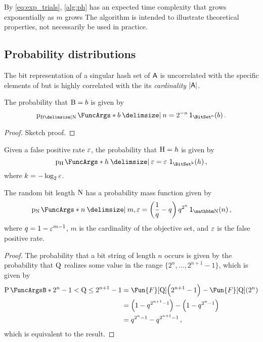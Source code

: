 \documentclass[ ../main.tex]{subfiles}
\begin{document}
By \cref{eq:exp_trials}, \cref{alg:ph} has an expected time complexity that grows exponentially as $m$ grows The algorithm is intended to illustrate theoretical properties, not necessarily be used in practice.

\subsection{Probability distributions}
The bit representation of a singular hash set of $\Set{A}$ is uncorrelated with the specific elements of but is highly correlated with the its \emph{cardinality} $\Card{\Set{A}}$.



The probability that $\mathrm{B} = b$ is given by
\begin{equation}
\PDF{b \Given n}[\RV{B} \Given \RV{N}] = 2^{-n} \SetIndicator{\BitSet^n}(b)\,.
\end{equation}
\begin{proof}
Sketch proof.
\end{proof}




Given a false positive rate $\varepsilon$, the probability that $\mathrm{H} = h$ is given by
\begin{equation}
	\PDF{h \Given \fprate}[\RV{H}] = \fprate \, \SetIndicator{\BitSet^k}(h)\,,
\end{equation}
where $k = -\log_2 \varepsilon$.



\begin{theorem}
	The random bit length $\mathrm{N}$ has a probability mass function given by
	\begin{equation}
	\label{eq:N_pmf}
	\PDF{n \Given m, \fprate}[\RV{N}] = \left(\frac{1}{q}-q\right) q^{2^n} \SetIndicator{\NatSet}(n)\,,	
	\end{equation}
	where $q = 1 - \varepsilon^{m-1}$, $m$ is the cardinality of the objective set, and $\varepsilon$ is the false positive rate.
\end{theorem}
\begin{proof}
The probability that a bit string of length $n$ occurs is given by the probability that $\mathrm{Q}$ realizes some value in the range $\{2^n, \ldots, 2^{n+1}-1\}$, which is given by
\begin{align}
	\Prob{2^n-1 < \RV{Q} \leq 2^{n+1}-1}
		&= \Fun{F}[\RV{Q}]\!\left(2^{n+1}-1\right)-\Fun{F}[\RV{Q}]\!\left(2^n\right)\\
		&= \left(1-q^{2^{n+1}-1}\right) - \left(1-q^{2^n-1}\right)\\		
		&= q^{2^n-1} - q^{2^{n+1}-1}\,,
\end{align}
which is equivalent to the result.
\end{proof}
\end{document}
